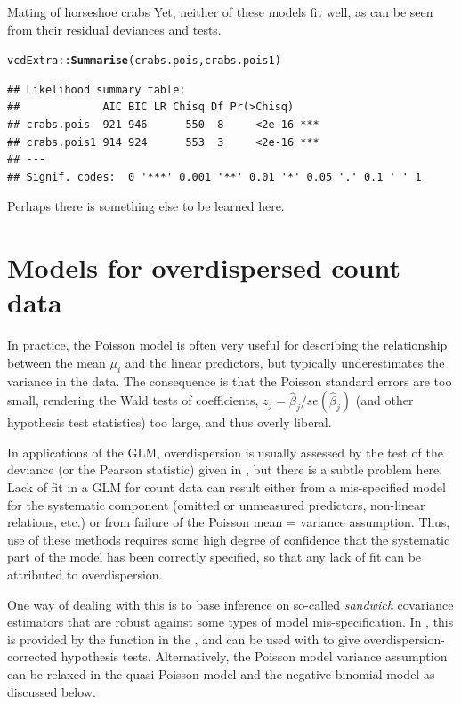 \documentclass[11pt]{book}\usepackage[]{graphicx}\usepackage[]{color}
\makeatletter
\newcommand{\hlstd}[1]{\textcolor[rgb]{0.345,0.345,0.345}{#1}}%
\newcommand{\hlkwd}[1]{\textcolor[rgb]{0.737,0.353,0.396}{\textbf{#1}}}%
\newenvironment{kframe}{%
 \def\at@end@of@kframe{}%
 \ifinner\ifhmode%
  \def\at@end@of@kframe{\end{minipage}}%
  \begin{minipage}{\columnwidth}%
 \fi\fi%
 \def\FrameCommand##1{\hskip\@totalleftmargin \hskip-\fboxsep
 \colorbox{shadecolor}{##1}\hskip-\fboxsep
     \hskip-\linewidth \hskip-\@totalleftmargin \hskip\columnwidth}%
 \MakeFramed {\advance\hsize-\width
   \@totalleftmargin\z@ \linewidth\hsize
   \@setminipage}}%
 {\par\unskip\endMakeFramed%
 \at@end@of@kframe}
\newenvironment{knitrout}{}{} %
\renewenvironment{knitrout}{\small\renewcommand{\baselinestretch}{.85}}{} %
\makeatother
\begin{document}
\begin{Example}[crabs1]{Mating of horseshoe crabs}
Yet, neither of these models fit well, as can be seen from their residual deviances
and \LR tests.
\begin{knitrout}
\color{fgcolor}\begin{kframe}
\begin{alltt}
\hlstd{vcdExtra::}\hlkwd{Summarise}\hlstd{(crabs.pois, crabs.pois1)}
\end{alltt}
\begin{verbatim}
## Likelihood summary table:
##             AIC BIC LR Chisq Df Pr(>Chisq)    
## crabs.pois  921 946      550  8     <2e-16 ***
## crabs.pois1 914 924      553  3     <2e-16 ***
## ---
## Signif. codes:  0 '***' 0.001 '**' 0.01 '*' 0.05 '.' 0.1 ' ' 1
\end{verbatim}
\end{kframe}
\end{knitrout}
Perhaps there is something else to be learned here.

\end{Example}

\section{Models for overdispersed count data}\label{sec:glm-overdisp}

In practice, the Poisson model is often very useful for describing the
relationship between the mean $\mu_i$ and the linear predictors, 
but typically underestimates the variance in the data.
The consequence is that the Poisson standard errors are too small,
rendering the Wald tests of coefficients, $z_j = \widehat{\beta}_j / se(\widehat{\beta}_j) $
(and other hypothesis test statistics)
too large, and thus overly liberal.  

In applications of the GLM, overdispersion is usually assessed by the \LR
test of the deviance (or the Pearson statistic) given in ,
but there is a subtle problem here. Lack of fit in a GLM for count data can result 
either from a mis-specified model for the systematic component
(omitted or unmeasured predictors, non-linear relations, etc.)
or from failure of the Poisson mean = variance assumption.
Thus, use of these methods requires some high degree of confidence that the
systematic part of the model has been correctly specified, so that any
lack of fit can be attributed to overdispersion.

One way of dealing with this is to base inference on 
so-called \emph{sandwich} covariance estimators that are robust against
some types of model mis-specification.  In \R, this is provided by the
 function in the , and can be used
with  to give overdispersion-corrected
hypothesis tests.
Alternatively, the Poisson model variance assumption can be relaxed
in the quasi-Poisson model and the negative-binomial model as
discussed below.
 
\end{document}
